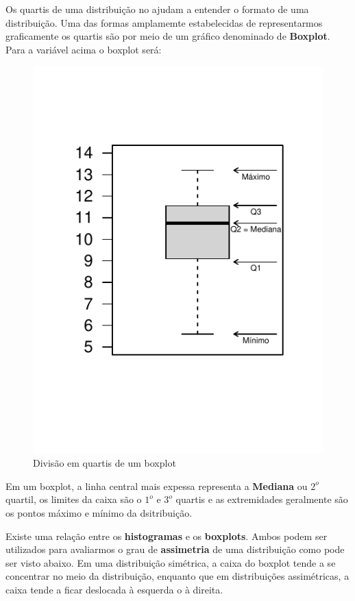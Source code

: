 \documentclass[
]{book}
\begin{document}
Os quartis de uma distribuição no ajudam a entender o formato de uma distribuição. Uma das formas amplamemte estabelecidas de representarmos graficamente os quartis são por meio de um gráfico denominado de \textbf{Boxplot}. Para a variável acima o boxplot será:

\begin{figure}

{\centering \includegraphics{probest-cambientais_files/figure-latex/boxquartis-1} 

}

\caption{Divisão em quartis de um boxplot}\label{fig:boxquartis}
\end{figure}

Em um boxplot, a linha central mais expessa representa a \textbf{Mediana} ou \(2^o\) quartil, os limites da caixa são o \(1^o\) e \(3^o\) quartis e as extremidades geralmente são os pontos máximo e mínimo da dsitribuição.

Existe uma relação entre os \textbf{histogramas} e os \textbf{boxplots}. Ambos podem ser utilizados para avaliarmos o grau de \textbf{assimetria} de uma distribuição como pode ser visto abaixo. Em uma distribuição simétrica, a caixa do boxplot tende a se concentrar no meio da distribuição, enquanto que em distribuições assimétricas, a caixa tende a ficar deslocada à esquerda o à direita.
\end{document}
